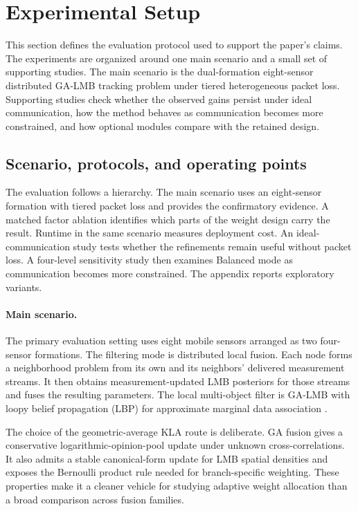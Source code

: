 \section{Experimental Setup}
\label{sec:experimental-setup}

This section defines the evaluation protocol used to support the paper's claims. The experiments are organized around one main scenario and a small set of supporting studies. The main scenario is the dual-formation eight-sensor distributed GA-LMB tracking problem under tiered heterogeneous packet loss. Supporting studies check whether the observed gains persist under ideal communication, how the method behaves as communication becomes more constrained, and how optional modules compare with the retained design.

\subsection{Scenario, protocols, and operating points}

The evaluation follows a hierarchy. The main scenario uses an eight-sensor formation with tiered packet loss and provides the confirmatory evidence. A matched factor ablation identifies which parts of the weight design carry the result. Runtime in the same scenario measures deployment cost. An ideal-communication study tests whether the refinements remain useful without packet loss. A four-level sensitivity study then examines Balanced mode as communication becomes more constrained. The appendix reports exploratory variants.

\paragraph{Main scenario.}

The primary evaluation setting uses eight mobile sensors arranged as two four-sensor formations. The filtering mode is distributed local fusion. Each node forms a neighborhood problem from its own and its neighbors' delivered measurement streams. It then obtains measurement-updated LMB posteriors for those streams and fuses the resulting parameters. The local multi-object filter is GA-LMB with loopy belief propagation (LBP) for approximate marginal data association \cite{WilliamsLau2014LBP}.

The choice of the geometric-average KLA route is deliberate. GA fusion gives a conservative logarithmic-opinion-pool update under unknown cross-correlations. It also admits a stable canonical-form update for LMB spatial densities and exposes the Bernoulli product rule needed for branch-specific weighting. These properties make it a cleaner vehicle for studying adaptive weight allocation than a broad comparison across fusion families.

